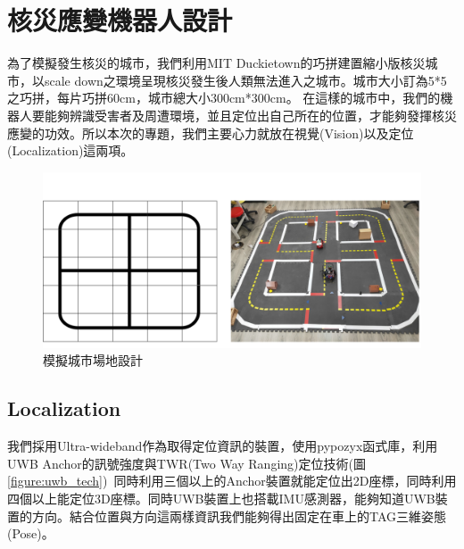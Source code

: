 \section{核災應變機器人設計}
為了模擬發生核災的城市，我們利用MIT Duckietown的巧拼建置縮小版核災城市，以scale down之環境呈現核災發生後人類無法進入之城市。城市大小訂為5*5之巧拼，每片巧拼60cm，城市總大小300cm*300cm。
在這樣的城市中，我們的機器人要能夠辨識受害者及周遭環境，並且定位出自己所在的位置，才能夠發揮核災應變的功效。所以本次的專題，我們主要心力就放在視覺(Vision)以及定位(Localization)這兩項。

\begin{figure}[h]
  \centering
    \includegraphics[width=\columnwidth]{images/field.png}
        \caption{模擬城市場地設計}
 \label{figure:field}
\end{figure}

\subsection{Localization}
我們採用Ultra-wideband作為取得定位資訊的裝置，使用pypozyx函式庫，利用UWB Anchor的訊號強度與TWR(Two Way Ranging)定位技術(圖\ref{figure:uwb_tech})~\cite{7491981}同時利用三個以上的Anchor裝置就能定位出2D座標，同時利用四個以上能定位3D座標。同時UWB裝置上也搭載IMU感測器，能夠知道UWB裝置的方向。結合位置與方向這兩樣資訊我們能夠得出固定在車上的TAG三維姿態(Pose)。

